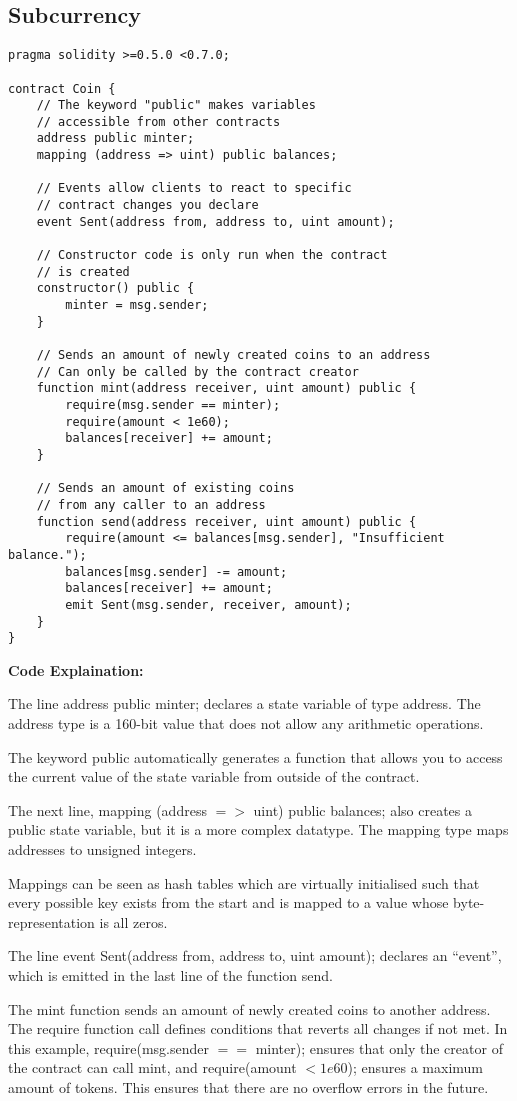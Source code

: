 \documentclass{article}
\begin{document}
\subsection{Subcurrency}
\begin{lstlisting}[language=Solidity]
pragma solidity >=0.5.0 <0.7.0;

contract Coin {
    // The keyword "public" makes variables
    // accessible from other contracts
    address public minter;
    mapping (address => uint) public balances;

    // Events allow clients to react to specific
    // contract changes you declare
    event Sent(address from, address to, uint amount);

    // Constructor code is only run when the contract
    // is created
    constructor() public {
        minter = msg.sender;
    }

    // Sends an amount of newly created coins to an address
    // Can only be called by the contract creator
    function mint(address receiver, uint amount) public {
        require(msg.sender == minter);
        require(amount < 1e60);
        balances[receiver] += amount;
    }

    // Sends an amount of existing coins
    // from any caller to an address
    function send(address receiver, uint amount) public {
        require(amount <= balances[msg.sender], "Insufficient balance.");
        balances[msg.sender] -= amount;
        balances[receiver] += amount;
        emit Sent(msg.sender, receiver, amount);
    }
}
\end{lstlisting}
\textbf{Code Explaination:}\\
\par
The line address public minter; declares a state variable of type address. The address type is a 160-bit value that does not allow any arithmetic operations. \par
The keyword public automatically generates a function that allows you to access the current value of the state variable from outside of the contract. \par
The next line, mapping (address $=>$ uint) public balances; also creates a public state variable, but it is a more complex datatype. The mapping type maps addresses to unsigned integers. \par
Mappings can be seen as hash tables which are virtually initialised such that every possible key exists from the start and is mapped to a value whose byte-representation is all zeros.\par
The line event Sent(address from, address to, uint amount); declares an “event”, which is emitted in the last line of the function send. \par
The mint function sends an amount of newly created coins to another address. The require function call defines conditions that reverts all changes if not met. In this example, require(msg.sender $==$ minter); ensures that only the creator of the contract can call mint, and require(amount $< 1e60$); ensures a maximum amount of tokens. This ensures that there are no overflow errors in the future.
\end{document}
